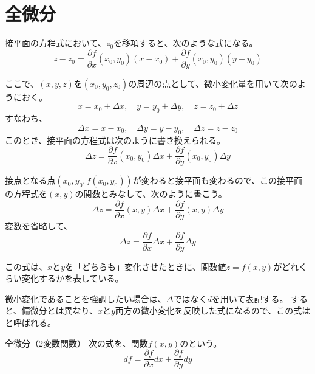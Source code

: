\documentclass[../../../topic_calculus]{subfiles}
\begin{document}
\sectionline
\section{全微分}

接平面の方程式において、$z_0$を移項すると、次のような式になる。
\begin{equation*}
  z - z_0 = \frac{\partial f}{\partial x}(x_0,y_0)(x - x_0) + \frac{\partial f}{\partial y}(x_0,y_0)(y - y_0)
\end{equation*}

ここで、$(x,y,z)$を$(x_0,y_0,z_0)$の周辺の点として、微小変化量を用いて次のようにおく。
\begin{equation*}
  x = x_0 + \Delta x, \quad
  y = y_0 + \Delta y, \quad
  z = z_0 + \Delta z
\end{equation*}
すなわち、
\begin{equation*}
  \Delta x = x - x_0, \quad
  \Delta y = y - y_0, \quad
  \Delta z = z - z_0
\end{equation*}
このとき、接平面の方程式は次のように書き換えられる。
\begin{equation*}
  \Delta z = \frac{\partial f}{\partial x}(x_0,y_0)\Delta x + \frac{\partial f}{\partial y}(x_0,y_0)\Delta y
\end{equation*}

接点となる点$(x_0,y_0,f(x_0, y_0))$が変わると接平面も変わるので、この接平面の方程式を$(x,y)$の関数とみなして、次のように書こう。
\begin{equation*}
  \Delta z = \frac{\partial f}{\partial x}(x,y)\Delta x + \frac{\partial f}{\partial y}(x,y)\Delta y
\end{equation*}
変数を省略して、
\begin{equation*}
  \Delta z = \frac{\partial f}{\partial x}\Delta x + \frac{\partial f}{\partial y}\Delta y
\end{equation*}

この式は、$x$と$y$を「どちらも」変化させたときに、関数値$z=f(x,y)$がどれくらい変化するかを表している。

微小変化であることを強調したい場合は、$\Delta$ではなく$d$を用いて表記する。
すると、偏微分とは異なり、$x$と$y$両方の微小変化を反映した式になるので、この式はと呼ばれる。

\begin{definition}{全微分（2変数関数）}
  次の式を、関数$f(x,y)$のという。
  \begin{equation}
    df = \frac{\partial f}{\partial x}dx + \frac{\partial f}{\partial y}dy
  \end{equation}
\end{definition}
\end{document}
